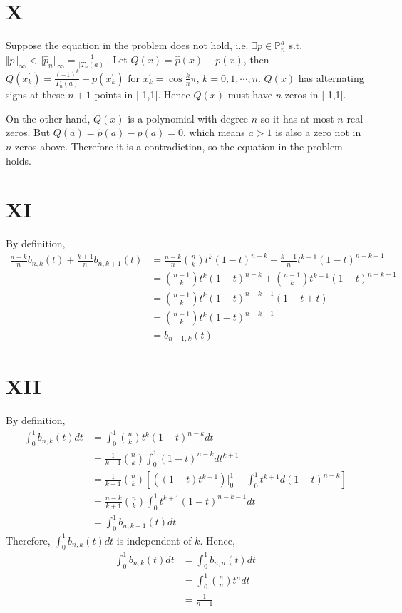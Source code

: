 \documentclass[a4paper]{article}
\begin{document}
\section*{X}
Suppose the equation in the problem does not hold, i.e. $\exists p \in \mathbb{P}_n^a$ s.t. $\Vert p \Vert_\infty < \Vert \hat{p}_n \Vert_\infty = \frac{1}{|T_n(a)|}$. Let $Q(x) = \hat{p}(x) - p(x)$, 
then $Q(x_k^{'}) = \frac{(-1)^k}{T_n(a)} - p(x_k^{'})$ for $x_k^{'} = \cos\frac{k}{n}\pi$, $k=0,1,\cdots,n$. $Q(x)$ has alternating signs at these $n+1$ points in [-1,1]. Hence $Q(x)$ 
must have $n$ zeros in [-1,1].

On the other hand, $Q(x)$ is a polynomial with degree $n$ so it has at most $n$ real zeros. But $Q(a) = \hat{p}(a) - p(a) = 0$, which means $a > 1$ is also a zero not in $n$ zeros above. Therefore it is 
a contradiction, so the equation in the problem holds.

\section*{XI}
By definition,
\begin{align*}
\frac{n-k}{n}b_{n,k}(t) + \frac{k+1}{n}b_{n,k+1}(t) &= \frac{n-k}{n}{n \choose k}t^k(1-t)^{n-k} + \frac{k+1}{n}t^{k+1}(1-t)^{n-k-1} \\
&= {n-1 \choose k}t^k(1-t)^{n-k} + {n-1 \choose k}t^{k+1}(1-t)^{n-k-1} \\
&= {n-1 \choose k}t^k(1-t)^{n-k-1}(1-t+t) \\
&= {n-1 \choose k}t^k(1-t)^{n-k-1} \\
&= b_{n-1,k}(t)
\end{align*}

\section*{XII}
By definition,
\begin{align*}
\int_0^1 b_{n,k}(t) dt &= \int_0^1 {n \choose k}t^k(1-t)^{n-k}dt \\
&= \frac{1}{k+1}{n \choose k} \int_0^1 (1-t)^{n-k}dt^{k+1} \\
&= \frac{1}{k+1} {n \choose k}[((1-t)t^{k+1})|_0^1 - \int_0^1 t^{k+1} d(1-t)^{n-k}] \\
&= \frac{n-k}{k+1}{n \choose k}\int_0^1 t^{k+1}(1-t)^{n-k-1}dt \\
&= \int_0^1 b_{n,k+1}(t) dt
\end{align*}
Therefore, $\int_0^1 b_{n,k}(t) dt$ is independent of $k$. Hence,
\begin{align*}
\int_0^1 b_{n,k}(t) dt &= \int_0^1 b_{n,n}(t) dt \\
&= \int_0^1 {n \choose n}t^n dt \\
&= \frac{1}{n+1}
\end{align*}
\end{document}
